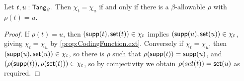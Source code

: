 \begin{proposition}
  \label{def:code_eq_code_iff}
  Let \( t, u : \mathsf{Tang}_\beta \).
  Then \( \chi_t = \chi_u \) if and only if there is a \( \beta \)-allowable \( \rho \) with \( \rho(t) = u \).
\end{proposition}
\begin{proof}
  If \( \rho(t) = u \), then \( (\operatorname{\mathsf{supp}}(t), \operatorname{\mathsf{set}}(t)) \in \chi_t \) implies \( (\operatorname{\mathsf{supp}}(u), \operatorname{\mathsf{set}}(u)) \in \chi_t \), giving \( \chi_t = \chi_u \) by \cref{prop:CodingFunction.ext}.
  Conversely if \( \chi_t = \chi_u \), then \( (\operatorname{\mathsf{supp}}(u), \operatorname{\mathsf{set}}(u)) \in \chi_t \), so there is \( \rho \) such that \( \rho(\operatorname{\mathsf{supp}}(t)) = \operatorname{\mathsf{supp}}(u) \), and \( (\rho(\operatorname{\mathsf{supp}}(t)), \rho(\operatorname{\mathsf{set}}(t))) \in \chi_t \), so by coinjectivity we obtain \( \rho(set(t)) = \operatorname{\mathsf{set}}(u) \) as required.
\end{proof}

